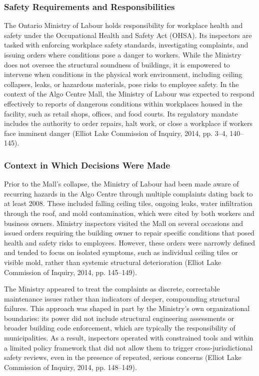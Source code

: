 \documentclass[12pt]{article}
\begin{document}
\subsubsection*{Safety Requirements and Responsibilities}
The Ontario Ministry of Labour holds responsibility for workplace health and safety under the Occupational Health and Safety Act (OHSA). Its inspectors are tasked with enforcing workplace safety standards, investigating complaints, and issuing orders where conditions pose a danger to workers. While the Ministry does not oversee the structural soundness of buildings, it is empowered to intervene when conditions in the physical work environment, including ceiling collapses, leaks, or hazardous materials, pose risks to employee safety. In the context of the Algo Centre Mall, the Ministry of Labour was expected to respond effectively to reports of dangerous conditions within workplaces housed in the facility, such as retail shops, offices, and food courts. Its regulatory mandate includes the authority to order repairs, halt work, or close a workplace if workers face imminent danger (Elliot Lake Commission of Inquiry, 2014, pp. 3–4, 140–145).

\subsubsection*{Context in Which Decisions Were Made}
Prior to the Mall's collapse, the Ministry of Labour had been made aware of recurring hazards in the Algo Centre through multiple complaints dating back to at least 2008. These included falling ceiling tiles, ongoing leaks, water infiltration through the roof, and mold contamination, which were cited by both workers and business owners. Ministry inspectors visited the Mall on several occasions and issued orders requiring the building owner to repair specific conditions that posed health and safety risks to employees. However, these orders were narrowly defined and tended to focus on isolated symptoms, such as individual ceiling tiles or visible mold, rather than systemic structural deterioration (Elliot Lake Commission of Inquiry, 2014, pp. 145–149).

The Ministry appeared to treat the complaints as discrete, correctable maintenance issues rather than indicators of deeper, compounding structural failures. This approach was shaped in part by the Ministry’s own organizational boundaries: its power did not include structural engineering assessments or broader building code enforcement, which are typically the responsibility of municipalities. As a result, inspectors operated with constrained tools and within a limited policy framework that did not allow them to trigger cross-jurisdictional safety reviews, even in the presence of repeated, serious concerns (Elliot Lake Commission of Inquiry, 2014, pp. 148–149).
\end{document}
